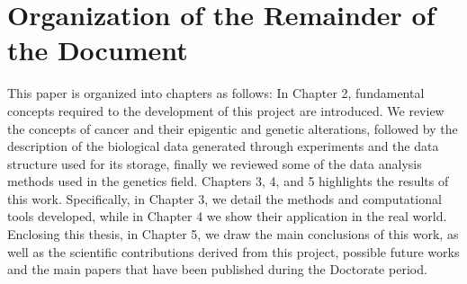 \section{Organization of the Remainder of the Document}


This paper is organized into chapters as follows: In Chapter 2,
fundamental concepts required to the development of this project are introduced.
We review the concepts of cancer and their epigentic and genetic alterations,
followed by the description of the biological data generated through experiments and the data structure used for its storage,
finally we reviewed some of the data analysis methods used in the genetics field.
Chapters 3, 4, and 5 highlights the results of this work. Specifically, in Chapter 3,
we detail the methods and computational tools developed, while in Chapter 4 we
show their application in the real world. Enclosing this thesis, in Chapter 5,
we draw the main conclusions of this work, as well as the scientific contributions
derived from this project, possible future works and the main papers
that have been published during the Doctorate period.
